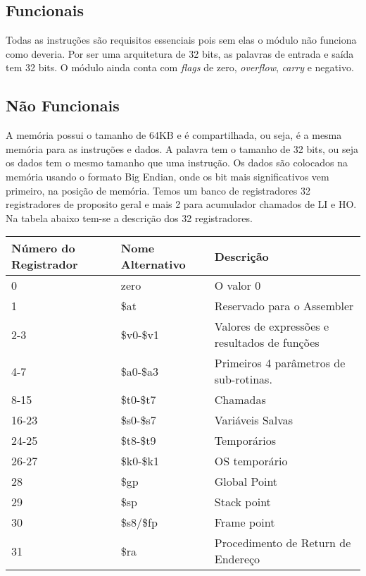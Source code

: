 \documentclass{report}
\begin{document}
  \subsection{Funcionais}
  Todas as instruções são requisitos essenciais pois sem elas o módulo não funciona como deveria. Por ser uma arquitetura de 32 bits, as palavras de entrada e saída tem 32 bits. O módulo ainda conta com \textit{flags} de zero, \textit{overflow}, \textit{carry} e negativo.
  
  \subsection{Não Funcionais}
  A memória possui o tamanho de 64KB e é compartilhada, ou seja, é a mesma memória para as instruções e dados. A palavra tem o tamanho de 32 bits, ou seja os dados tem o mesmo tamanho que uma instrução. Os dados são colocados na memória usando o formato Big Endian, onde os bit mais significativos vem primeiro, na posição de memória.  Temos um banco de registradores 32 registradores de proposito geral e mais 2 para acumulador chamados de LI e HO. Na tabela abaixo tem-se a descrição dos 32 registradores.
  
  \FloatBarrier
    \begin{table}[H]
      \begin{center}
        \begin{tabular}[pos]{|m{3cm} | m{3cm}| m{8cm} |} 
          \hline
          \cellcolor[gray]{0.9}\textbf{Número do Registrador} & \cellcolor[gray]{0.9}\textbf{Nome Alternativo} & \cellcolor[gray]{0.9}\textbf{Descrição} \\ \hline
              0  & zero & O valor 0 \\ \hline
              1  & \$at & Reservado para o Assembler\\ \hline
              2-3  & \$v0-\$v1 & Valores de expressões e resultados de funções\\ \hline
              4-7  & \$a0-\$a3 & Primeiros 4 parâmetros de sub-rotinas.\\ \hline
              8-15  & \$t0-\$t7 & Chamadas  \\ \hline
              16-23  & \$s0-\$s7 &  Variáveis Salvas\\ \hline
              24-25  & \$t8-\$t9 & Temporários \\ \hline
              26-27  & \$k0-\$k1 &  OS temporário \\ \hline
              28  & \$gp & Global Point \\  \hline
              29  & \$sp & Stack point \\ \hline
              30  & \$s8/\$fp & Frame point\\ \hline
              31  & \$ra & Procedimento de Return de Endereço \\ \hline
        \end{tabular}
      \end{center}
    \end{table}  
 
\end{document}
